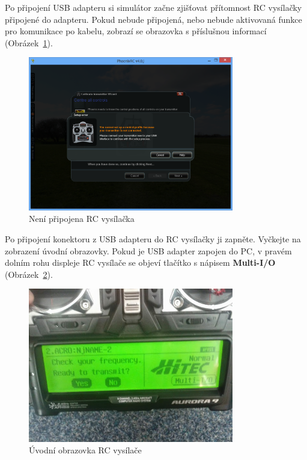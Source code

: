 \documentclass[11pt, a4paper]{article}
\begin{document}
Po připojení USB adapteru si simulátor začne zjišťovat přítomnost RC vysílačky připojené do adapteru. Pokud nebude připojená, nebo nebude aktivovaná funkce pro komunikace po kabelu, zobrazí se obrazovka s příslušnou informací (Obrázek~\ref{fig:obr2}).

\begin{figure}[h]
\begin{center}
\includegraphics[width=0.8\textwidth]{fig/2.PNG}
\caption{Není připojena RC vysílačka}
\label{fig:obr2}
\end{center}
\end{figure}

Po připojení konektoru z USB adapteru do RC vysílačky ji zapněte. Vyčkejte na zobrazení úvodní obrazovky. Pokud je USB adapter zapojen do PC, v pravém dolním rohu displeje RC vysílače se objeví tlačítko s nápisem \textbf{Multi-I/O} (Obrázek~\ref{fig:obr3}).

\begin{figure}[h]
\begin{center}
\includegraphics[width=0.8\textwidth]{fig/rc1.jpg}
\caption{Úvodní obrazovka RC vysílače}
\label{fig:obr3}
\end{center}
\end{figure}
\end{document}
